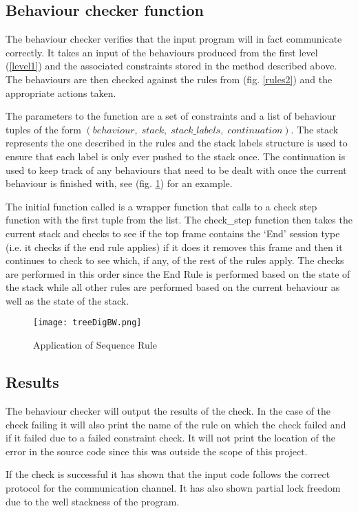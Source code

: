 \subsection{Behaviour checker function}

The behaviour checker verifies that the input program will in fact communicate correctly. It takes an input of the behaviours produced from the first level (\ref{level1}) and the associated constraints stored in the method described above. The behaviours are then checked against the rules from (fig. \ref{rules2}) and the appropriate actions taken. 

The parameters to the function are a set of constraints and a list of behaviour tuples of the form $(behaviour,\; stack,\; stack\_labels,\; continuation)$. The stack represents the one described in the rules and the stack labels structure is used to ensure that each label is only ever pushed to the stack once. The continuation is used to keep track of any behaviours that need to be dealt with once the current behaviour is finished with, see (fig. \ref{seq}) for an example. 

The initial function called is a wrapper function that calls to a check step function with the first tuple from the list. The check_step function then takes the current stack and checks to see if the top frame contains the `End' session type (i.e. it checks if the end rule applies) if it does it removes this frame and then it continues to check to see which, if any, of the rest of the rules apply. The checks are performed in this order since the End Rule is performed based on the state of the stack while all other rules are performed based on the current behaviour as well as the state of the stack. 

\begin{figure}
\texttt{[image: treeDigBW.png]}
\caption{Application of Sequence Rule}
\label{seq}
\end{figure}

\subsection{Results}
The behaviour checker will output the results of the check. In the case of the check failing it will also print the name of the rule on which the check failed and if it failed due to a failed constraint check. It will not print the location of the error in the source code since this was outside the scope of this project.

If the check is successful it has shown that the input code follows the correct protocol for the communication channel. It has also shown partial lock freedom due to the well stackness of the program. 

